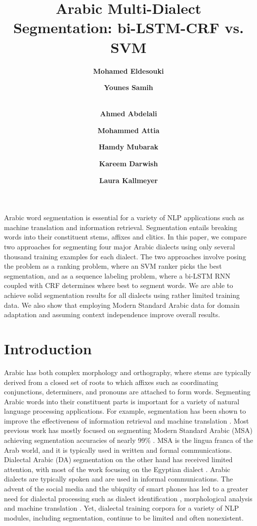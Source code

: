 \documentclass[11pt,letterpaper]{article}
\title{Arabic Multi-Dialect Segmentation: bi-LSTM-CRF vs. SVM}
\author[1]{\bf Mohamed Eldesouki}
\author[2]{\bf Younes Samih}
\author[1]{\\ \bf Ahmed Abdelali}
\author[3]{\bf Mohammed Attia}
\author[1]{\bf Hamdy Mubarak}
\author[1]{\bf Kareem Darwish}
\author[2]{\bf Laura Kallmeyer}
\affil[1]{Qatar Computing Research Institute, HBKU, Doha, Qatar}
\affil[2]{Dept. of Computational Linguistics,University of D\"usseldorf, D\"usseldorf, Germany}
\affil[3]{Google Inc., New York City, USA}
\affil[1]{\texttt{\{mohamohamed,hmubarak,aabdelali,kdarwish\}@hbku.edu.qa}}
\affil[2]{\texttt{\{samih,kallmeyer\}@phil.hhu.de} }
\affil[3]{\texttt{attia@google.com} }
\date{}
\begin{document}
\maketitle

\begin{abstractx}
Arabic word segmentation is essential for a variety of NLP applications such as machine translation and information retrieval. Segmentation entails breaking words into their constituent stems, affixes and clitics. In this paper, we compare two approaches for segmenting four major Arabic dialects using only several thousand training examples for each dialect.  The two approaches involve posing the problem as a ranking problem, where an SVM ranker picks the best segmentation, and as a sequence labeling problem, where a bi-LSTM RNN coupled with CRF determines where best to segment words. We are able to achieve solid segmentation results for all dialects using rather limited training data. We also show that employing Modern Standard Arabic data for domain adaptation and assuming context independence improve overall results.
\end{abstractx}

\section{Introduction}
Arabic has both complex morphology and orthography, where stems are typically derived from a closed set of roots to which affixes such as coordinating conjunctions, determiners, and pronouns are attached to form words. Segmenting Arabic words into their constituent parts is important for a variety of natural language processing applications. For example, segmentation has been shown to improve the effectiveness of information retrieval \cite{darwish2014arabic} and machine translation \cite{habash2006arabic}. Most previous work has mostly focused on segmenting Modern Standard Arabic (MSA) achieving segmentation accuracies of nearly 99\% \cite{abdelali2016farasa,pasha2014madamira}. MSA is the lingua franca of the Arab world, and it is typically used in written and formal communications. Dialectal Arabic (DA) segmentation on the other hand has received limited attention, with most of the work focusing on the Egyptian dialect \cite{habash2013morphological,samih2017neural}. Arabic dialects are typically spoken and are used in informal communications.  The advent of the social media and the ubiquity of smart phones has led to a greater need for dialectal processing such as dialect identification \cite{eldesouki2016qcri,khurana2016multi}, morphological analysis \cite{habash2013morphological} and machine translation \cite{sennrich-haddow-birch:2016:P16-12,Sajjad:2013ac}.  Yet, dialectal training corpora for a variety of NLP modules, including segmentation, continue to be limited and often nonexistent.
\end{document}
